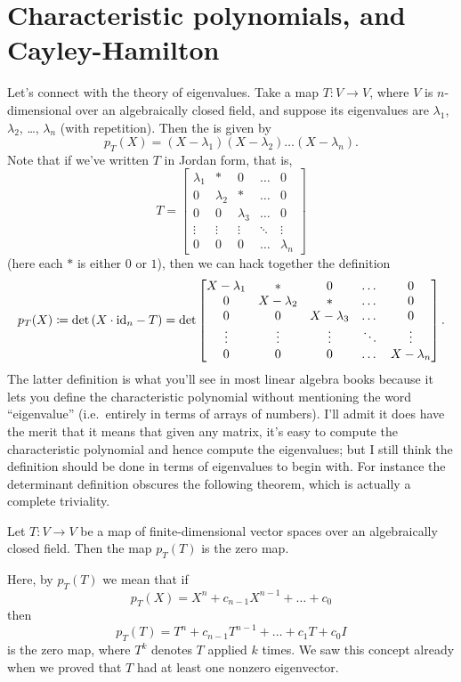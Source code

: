 \section{Characteristic polynomials, and Cayley-Hamilton}
Let's connect with the theory of eigenvalues.
Take a map $T \colon V \to V$, where $V$ is $n$-dimensional
over an algebraically closed field,
and suppose its eigenvalues
are $\lambda_1$, $\lambda_2$, \dots, $\lambda_n$ (with repetition).
Then the  is given by
\[
	p_T(X) = (X-\lambda_1)(X-\lambda_2) \dots (X-\lambda_n).
\]
Note that if we've written $T$ in Jordan form, that is,
\[
	T = \begin{bmatrix}
		\lambda_1 & \ast & 0 & \dots & 0 \\
		0 & \lambda_2 & \ast & \dots & 0 \\
		0 & 0 & \lambda_3 & \dots & 0 \\
		\vdots & \vdots & \vdots & \ddots & \vdots \\
		0 & 0 & 0 & \dots & \lambda_n
	\end{bmatrix}
\]
(here each $\ast$ is either $0$ or $1$),
then we can hack together the definition
\[
	p_T(X) \coloneqq
	\det \left( X \cdot \mathrm{id}_n - T \right)
	= \det \begin{bmatrix}
		X - \lambda_1 & \ast & 0 & \dots & 0 \\
		0 & X - \lambda_2 & \ast & \dots & 0 \\
		0 & 0 & X - \lambda_3 & \dots & 0 \\
		\vdots & \vdots & \vdots & \ddots & \vdots \\
		0 & 0 & 0 & \dots & X - \lambda_n
	\end{bmatrix}.
\]
The latter definition is what you'll see in most
linear algebra books because it lets you define the characteristic polynomial
without mentioning the word ``eigenvalue''
(i.e.\ entirely in terms of arrays of numbers).
I'll admit it does have the merit that it means that given any matrix,
it's easy to compute the characteristic polynomial and hence
compute the eigenvalues;
but I still think the definition should be done in terms of
eigenvalues to begin with.
For instance the determinant definition obscures the following theorem,
which is actually a complete triviality.
\begin{theorem}
	Let $T \colon V \to V$ be a map of finite-dimensional
	vector spaces over an algebraically closed field.
	Then the map $p_T(T)$ is the zero map.
\end{theorem}
Here, by $p_T(T)$ we mean that if
\[ p_T(X) = X^n + c_{n-1} X^{n-1} + \dots + c_0 \]
then \[ p_T(T) = T^n + c_{n-1} T^{n-1} + \dots + c_1 T +  c_0 I \]
is the zero map,
where $T^k$ denotes $T$ applied $k$ times.
We saw this concept already when we proved
that $T$ had at least one nonzero eigenvector.

